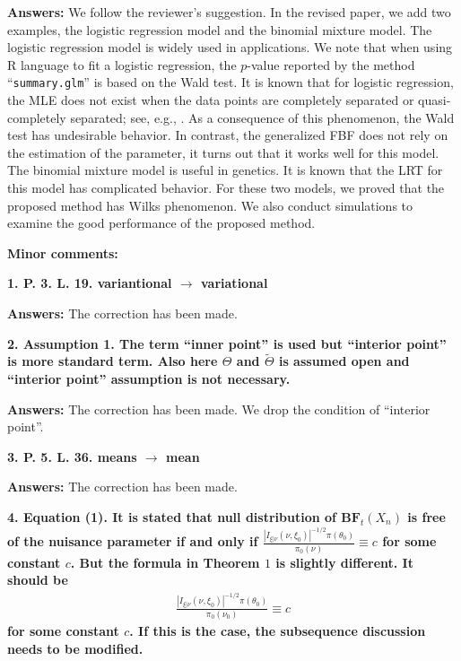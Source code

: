 \documentclass[11pt]{article}
\theoremstyle{plain}
\theoremstyle{definition}
\theoremstyle{remark}
\begin{document}
\textbf{Answers:}
We follow the reviewer's suggestion.
In the revised paper, we add two examples, the logistic regression model and the binomial mixture model.
The logistic regression model is widely used in applications.
We note that when using R language to fit a logistic regression, the $p$-value reported by the method ``\texttt{summary.glm}'' is based on the Wald test.
It is known that for logistic regression, the MLE does not exist when the data points are completely separated or quasi-completely separated; see, e.g., \cite{Albert1984On,Candes2020The_phase}.
As a consequence of this phenomenon, the Wald test has undesirable behavior.
In contrast, the generalized FBF does not rely on the estimation of the parameter, it turns out that it works well for this model.
The binomial mixture model is useful in genetics.
It is known that the LRT for this model has complicated behavior.
For these two models, we proved that the proposed method has Wilks phenomenon.
We also conduct simulations to examine the good performance of the proposed method.

\textbf{Minor comments:}

\textbf{
1. 
P. 3. L. 19. variantional $\rightarrow$ variational
}

\textbf{Answers:}
The correction has been made.

\textbf{
2. Assumption 1. The term ``inner point'' is used but ``interior point'' is more standard term.
Also here $\Theta$ and $\tilde \Theta$ is assumed open and ``interior point'' assumption is not necessary.
}

\textbf{Answers:}
The correction has been made.
We drop the condition of ``interior point''.

\textbf{
    3. P. 5. L. 36. means $\rightarrow$ mean
}

\textbf{Answers:}
The correction has been made.



\textbf{
4.
Equation (1).
It is stated that null distribution of $\textbf{BF}_t(X_n)$ is free of the nuisance parameter if and only if $\frac{\left| I_{\xi | \nu} (\nu, \xi_0) \right|^{-1/2} \pi(\theta_0) }{\pi_0(\nu)} \equiv c$ for some constant $c$. But the formula in Theorem $1$ is slightly different.
It should be
\begin{align*}
\frac{\left| I_{\xi | \nu} (\nu, \xi_0) \right|^{-1/2} \pi(\theta_0) }{\pi_0(\nu_0)} \equiv c
\end{align*}
for some constant $c$.
If this is the case, the subsequence discussion needs to be modified.
}
\end{document}
